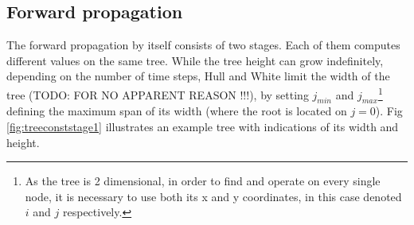 \subsection{Forward propagation}
The forward propagation by itself consists of two stages. Each of them computes different values on the same tree. While the tree height can grow indefinitely, depending on the number of time steps, Hull and White limit the width of the tree (TODO: FOR NO APPARENT REASON !!!), by setting $j_{min}$ and $j_{max}$\footnote{As the tree is 2 dimensional, in order to find and operate on every single node, it is necessary to use both its x and y coordinates, in this case denoted $i$ and $j$ respectively.} defining the maximum span of its width (where the root is located on $j=0$). Fig \ref{fig:treeconststage1} illustrates an example tree with indications of its width and height. 

